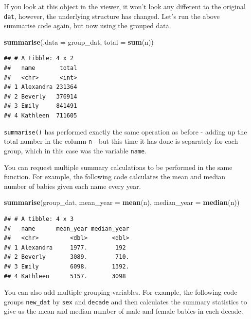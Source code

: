 \documentclass[]{book}
\newenvironment{Shaded}{\begin{snugshade}}{\end{snugshade}}
\newcommand{\DataTypeTok}[1]{\textcolor[rgb]{0.13,0.29,0.53}{#1}}
\newcommand{\KeywordTok}[1]{\textcolor[rgb]{0.13,0.29,0.53}{\textbf{#1}}}
\newcommand{\NormalTok}[1]{#1}
\begin{document}
If you look at this object in the viewer, it won't look any different to the original \texttt{dat}, however, the underlying structure has changed. Let's run the above summarise code again, but now using the grouped data.

\begin{Shaded}
\begin{Highlighting}[]
\KeywordTok{summarise}\NormalTok{(}\DataTypeTok{.data =}\NormalTok{ group_dat, }
          \DataTypeTok{total =} \KeywordTok{sum}\NormalTok{(n)) }
\end{Highlighting}
\end{Shaded}

\begin{verbatim}
## # A tibble: 4 x 2
##   name       total
##   <chr>      <int>
## 1 Alexandra 231364
## 2 Beverly   376914
## 3 Emily     841491
## 4 Kathleen  711605
\end{verbatim}

\texttt{summarise()} has performed exactly the same operation as before - adding up the total number in the column \texttt{n} - but this time it has done is separately for each group, which in this case was the variable \texttt{name}.

You can request multiple summary calculations to be performed in the same function. For example, the following code calculates the mean and median number of babies given each name every year.

\begin{Shaded}
\begin{Highlighting}[]
\KeywordTok{summarise}\NormalTok{(group_dat,}
          \DataTypeTok{mean_year =} \KeywordTok{mean}\NormalTok{(n),}
          \DataTypeTok{median_year =} \KeywordTok{median}\NormalTok{(n))}
\end{Highlighting}
\end{Shaded}

\begin{verbatim}
## # A tibble: 4 x 3
##   name      mean_year median_year
##   <chr>         <dbl>       <dbl>
## 1 Alexandra     1977.        192 
## 2 Beverly       3089.        710.
## 3 Emily         6098.       1392.
## 4 Kathleen      5157.       3098
\end{verbatim}

You can also add multiple grouping variables. For example, the following code groups \texttt{new\_dat} by \texttt{sex} and \texttt{decade} and then calculates the summary statistics to give us the mean and median number of male and female babies in each decade.
\end{document}
